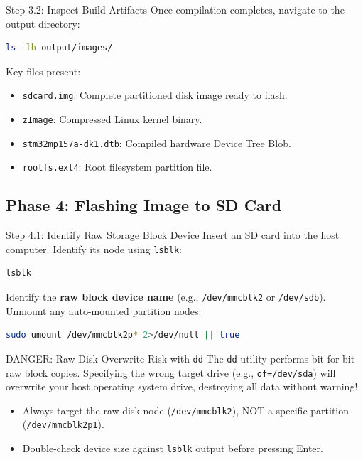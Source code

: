 \begin{cmdbox}{Step 3.2: Inspect Build Artifacts}
Once compilation completes, navigate to the output directory:
\begin{lstlisting}[language=bash]
ls -lh output/images/
\end{lstlisting}
Key files present:
\begin{itemize}[leftmargin=*]
    \item \texttt{sdcard.img}: Complete partitioned disk image ready to flash.
    \item \texttt{zImage}: Compressed Linux kernel binary.
    \item \texttt{stm32mp157a-dk1.dtb}: Compiled hardware Device Tree Blob.
    \item \texttt{rootfs.ext4}: Root filesystem partition file.
\end{itemize}
\end{cmdbox}

\subsection{Phase 4: Flashing Image to SD Card}

\begin{cmdbox}{Step 4.1: Identify Raw Storage Block Device}
Insert an SD card into the host computer. Identify its node using \texttt{lsblk}:
\begin{lstlisting}[language=bash]
lsblk
\end{lstlisting}
Identify the \textbf{raw block device name} (e.g., \texttt{/dev/mmcblk2} or \texttt{/dev/sdb}). Unmount any auto-mounted partition nodes:
\begin{lstlisting}[language=bash]
sudo umount /dev/mmcblk2p* 2>/dev/null || true
\end{lstlisting}
\end{cmdbox}

\begin{warningbox}{DANGER: Raw Disk Overwrite Risk with \texttt{dd}}
The \texttt{dd} utility performs bit-for-bit raw block copies. Specifying the wrong target drive (e.g., \texttt{of=/dev/sda}) will overwrite your host operating system drive, destroying all data without warning!
\begin{itemize}[leftmargin=*]
    \item Always target the raw disk node (\texttt{/dev/mmcblk2}), NOT a specific partition (\texttt{/dev/mmcblk2p1}).
    \item Double-check device size against \texttt{lsblk} output before pressing Enter.
\end{itemize}
\end{warningbox}

